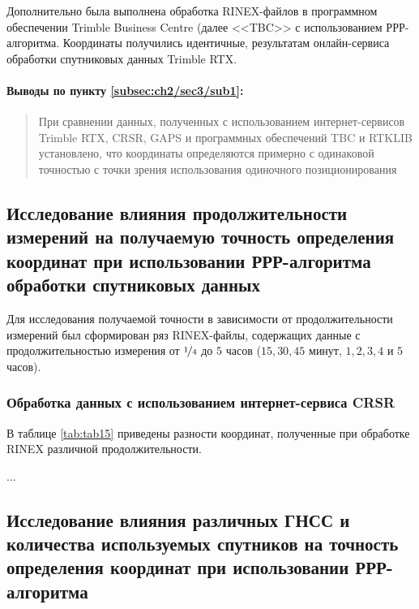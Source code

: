 Дополнительно была выполнена обработка RINEX-файлов в программном обеспечении Trimble Business Centre (далее <<TBC>> с использованием РРР-алгоритма. Координаты получились идентичные, результатам онлайн-сервиса обработки спутниковых данных Trimble RTX.

\paragraph{Выводы по пункту \cref{subsec:ch2/sec3/sub1}: } 
\begin{quote}
	При сравнении данных, полученных с использованием интернет-сервисов Trimble RTX, CRSR, GAPS и программных обеспечений TBC и RTKLIB установлено, что координаты определяются примерно с одинаковой точностью с точки зрения использования одиночного позиционирования
\end{quote}





\subsection[Влияние продолжительности измерений]{Исследование влияния продолжительности измерений на получаемую точность определения координат при использовании РРР-алгоритма обработки спутниковых данных}\label{subsec:ch2/sec3/sub2}

Для исследования получаемой точности в зависимости от продолжительности измерений был сформирован ряз RINEX-файлы, содержащих данные с продолжительностью измерения от $\nicefrac{1}{4}$ до $5$ часов ($15, 30, 45$ минут, $1, 2, 3, 4$ и $5$ часов).


\subsubsection{Обработка данных с использованием интернет-сервиса CRSR }\label{subsec:ch2/sec3/sub2/sub1}

В таблице \cref{tab:tab15} приведены разности координат, полученные при обработке RINEX различной продолжительности.

...




\subsection[Влияние используемых ГНСС и количества спутников]{Исследование влияния различных ГНСС и количества используемых спутников на точность определения координат при использовании РРР-алгоритма}\label{subsec:ch2/sec3/sub3}

